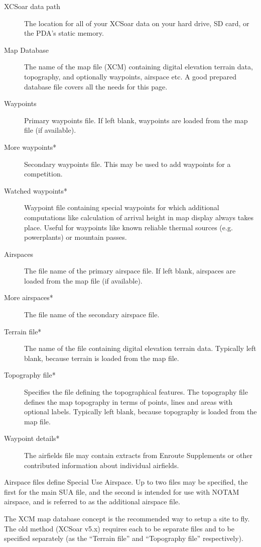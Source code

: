 \begin{description}
\item[XCSoar data path]  The location for all of your XCSoar data on your hard drive, 
  SD card, or the PDA's static memory.
\item[Map Database]  The name of the map file (XCM) containing digital elevation
  terrain data, topography, and optionally waypoints, airspace etc. A good
  prepared database file covers all the needs for this page.
\item[Waypoints]  Primary waypoints file.  If left blank, waypoints are loaded
  from the map file (if available).
\item[More waypoints*]  Secondary waypoints file.  This may be used to add 
  waypoints for a competition.
\item[Watched waypoints*]  Waypoint file containing special waypoints for 
  which additional computations   like calculation of arrival height in map 
  display always takes place. Useful for waypoints   like known reliable 
  thermal sources (e.g. powerplants) or mountain passes.
\item[Airspaces]  The file name of the primary airspace file.  If left blank,
  airspaces are loaded from the map file (if available).
\item[More airspaces*]  The file name of the secondary airspace file.
\item[Terrain file*]  The name of the file containing digital elevation
  terrain data.  Typically left blank, because terrain is loaded from the map
  file.
\item[Topography file*]  Specifies the file defining the topographical features.
  The topography file defines the map topography in terms of points, lines
  and areas with optional labels.  Typically left blank, because topography is
  loaded from the map file.
\item[Waypoint details*]  The airfields file may contain extracts from 
  Enroute Supplements or other contributed information about individual airfields.
\end{description}

Airspace files define Special Use Airspace.  Up to two files may be
specified, the first for the main SUA file, and the second is intended
for use with NOTAM airspace, and is referred to as the additional
airspace file.

The XCM map database concept is the recommended way to setup a site to fly.
The old method (XCSoar v5.x) requires each to be separate files and to be
specified separately (as the ``Terrain file'' and ``Topography file'' respectively).  

